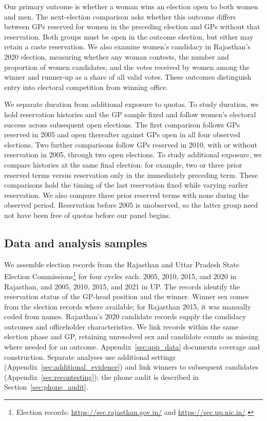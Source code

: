 \documentclass[11pt]{article}
\begin{document}
Our primary outcome is whether a woman wins an election open to both women and men. The next-election comparison asks whether this outcome differs between GPs reserved for women in the preceding election and GPs without that reservation. Both groups must be open in the outcome election, but either may retain a caste reservation. We also examine women's candidacy in Rajasthan's 2020 election, measuring whether any woman contests, the number and proportion of women candidates, and the votes received by women among the winner and runner-up as a share of all valid votes. These outcomes distinguish entry into electoral competition from winning office.

We separate duration from additional exposure to quotas. To study duration, we hold reservation histories and the GP sample fixed and follow women's electoral success across subsequent open elections. The first comparison follows GPs reserved in 2005 and open thereafter against GPs open in all four observed elections. Two further comparisons follow GPs reserved in 2010, with or without reservation in 2005, through two open elections. To study additional exposure, we compare histories at the same final election: for example, two or three prior reserved terms versus reservation only in the immediately preceding term. These comparisons hold the timing of the last reservation fixed while varying earlier reservation. We also compare three prior reserved terms with none during the observed period. Reservation before 2005 is unobserved, so the latter group need not have been free of quotas before our panel begins.

\subsection{Data and analysis samples}\label{sec:analysis_data}

We assemble election records from the Rajasthan and Uttar Pradesh State Election Commissions\footnote{Election records: \url{https://sec.rajasthan.gov.in/} and \url{https://sec.up.nic.in/}.} for four cycles each: 2005, 2010, 2015, and 2020 in Rajasthan, and 2005, 2010, 2015, and 2021 in UP. The records identify the reservation status of the GP-head position and the winner. Winner sex comes from the election records where available; for Rajasthan 2015, it was manually coded from names. Rajasthan's 2020 candidate records supply the candidacy outcomes and officeholder characteristics. We link records within the same election phase and GP, retaining unresolved sex and candidate counts as missing where needed for an outcome. Appendix~\ref{sec:app_data} documents coverage and construction. Separate analyses use additional settings (Appendix~\ref{sec:additional_evidence}) and link winners to subsequent candidates (Appendix~\ref{sec:recontesting}); the phone audit is described in Section~\ref{sec:phone_audit}.
\end{document}
